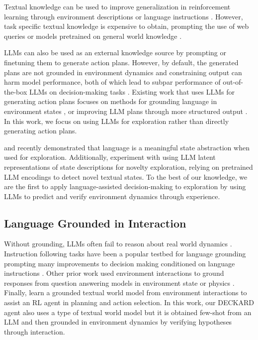 \documentclass[nohyperref]{article}
\theoremstyle{plain}
\theoremstyle{definition}
\theoremstyle{remark}
\newcommand{\agentshort}{\textsc{DECKARD}}
\begin{document}
Textual knowledge can be used to improve generalization in reinforcement learning through environment descriptions \cite{branavan2011learning,Zhong2020RTFM,hanjie2021grounding} or language instructions \cite{chevalier-boisvert2018babyai,Anderson_2018_CVPR,ku2020room,Shridhar_2020_CVPR}.
However, task specific textual knowledge is expensive to obtain, prompting the use of web queries \cite{nottingham2022learning} or models pretrained on general world knowledge \cite{dambekodi2020playing,SugliaEmbodied,ichter2022do,huanginner,song2022llm}.

LLMs can also be used as an external knowledge source by prompting or finetuning them to generate action plans.
However, by default, the generated plans are not grounded in environment dynamics and constraining output can harm model performance, both of which lead to subpar performance of out-of-the-box LLMs on decision-making tasks \cite{valmeekam2022large}. 
Existing work that uses LLMs for generating action plans focuses on methods for grounding language in environment states \cite{ichter2022do,huanginner,song2022llm}, or improving LLM plans through more structured output \cite{singhprogprompt,liang2022code}.
In this work, we focus on using LLMs for exploration rather than directly generating action plans.

\citet{tam2022semantic} and \citet{mu2022improving} recently demonstrated that language is a meaningful state abstraction when used for exploration.
Additionally, \citet{tam2022semantic} experiment with using LLM latent representations of state descriptions for novelty exploration, relying on pretrained LLM encodings to detect novel textual states.
To the best of our knowledge, we are the first to apply language-assisted decision-making to exploration by using LLMs to predict and verify environment dynamics through experience.

\subsection{Language Grounded in Interaction}

Without grounding, LLMs often fail to reason about real world dynamics \cite{bisk2020experience}.
Instruction following tasks have been a popular testbed for language grounding \cite{chevalier-boisvert2018babyai,Anderson_2018_CVPR,ku2020room,Shridhar_2020_CVPR} prompting many improvements to decision making conditioned on language instructions \cite{yu2018interactive,Lynch2020LanguageCI,nottingham2021modular,SugliaEmbodied,kuo2021compositional,zellers2021piglet,Song_2022_CVPR,pmlr-v164-blukis22a}.
Other prior work used environment interactions to ground responses from question answering models in environment state \cite{gordon2018iqa,Das_2018_CVPR} or physics \cite{liu2022mind}.
Finally, \citet{ammanabrolu2021learning} learn a grounded textual world model from environment interactions to assist an RL agent in planning and action selection.
In this work, our \agentshort{} agent also uses a type of textual world model but it is obtained few-shot from an LLM and then grounded in environment dynamics by verifying hypotheses through interaction.
\end{document}
